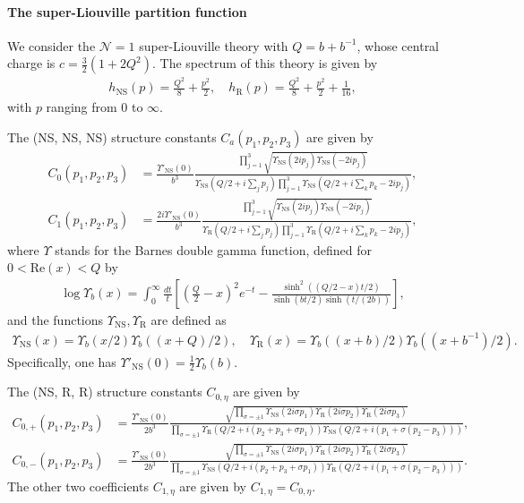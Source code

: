 \documentclass[12pt]{article}
\def\ie{\begin{equation}\begin{aligned}}
\def\fe{\end{aligned}\end{equation}}
\def\NS{\mathrm{NS}}
\def\R{\mathrm{R}}
\begin{document}
\begin{appendix}
\paragraph{The super-Liouville partition function} We consider the $\mathcal{N}=1$ super-Liouville theory with $Q=b+b^{-1}$, whose central charge is $c=\frac{3}{2}(1+2Q^2)$. The spectrum of this theory is given by
\ie
h_\NS(p) = \frac{Q^2}{8}+\frac{p^2}{2},\quad h_{\R}(p)= \frac{Q^2}{8}+\frac{p^2}{2} + \frac{1}{16},
\fe
with $p$ ranging from $0$ to $\infty$. 

The (NS, NS, NS) structure constants $C_a(p_1, p_2, p_3)$ are given by
\ie
C_0(p_1,p_2,p_3)&=\frac{\Upsilon'_{\NS}(0)}{b^3}
 \frac{\prod_{j=1}^3
       \sqrt{\Upsilon_{\NS}(2ip_j)\Upsilon_{\NS}(-2ip_j)}}
 {\Upsilon_{\NS}(Q/2+i\sum_jp_j)
       \prod_{j=1}^3\Upsilon_{\NS}(Q/2+i\sum_kp_k-2ip_j)},\\
C_1(p_1,p_2,p_3)&=\frac{2i\Upsilon'_{\NS}(0)}{b^3}
 \frac{\prod_{j=1}^3
       \sqrt{\Upsilon_{\NS}(2ip_j)\Upsilon_{\NS}(-2ip_j)}}
 {\Upsilon_{\R}(Q/2+i\sum_jp_j)
       \prod_{j=1}^3\Upsilon_{\R}(Q/2+i\sum_kp_k-2ip_j)},
\fe
where $\Upsilon$ stands for the Barnes double gamma function, defined for $0<\mathrm{Re}(x)<Q$ by
\ie
\log\Upsilon_b(x)=\int_0^\infty\frac{dt}{t}
 \left[\left(\frac Q2-x\right)^2e^{-t}
 -\frac{\sinh^2((Q/2-x)t/2)}
 {\sinh(bt/2)\sinh(t/(2b))}\right],
\fe
and the functions $\Upsilon_\NS, \Upsilon_\R$ are defined as
\ie
\Upsilon_{\NS}(x)=\Upsilon_b(x/2)\Upsilon_b((x+Q)/2),\quad
 \Upsilon_{\R}(x)=\Upsilon_b((x+b)/2)\Upsilon_b((x+b^{-1})/2).
\fe
Specifically, one has $\Upsilon'_{\NS}(0)=\frac12 \Upsilon_b(b)$.


The (NS, R, R) structure constants $C_{0,\eta}$ are given by
\ie
C_{0,+}(p_1,p_2,p_3)
 &=\frac{\Upsilon'_{\NS}(0)}{2b^3}
 \frac{\sqrt{\prod_{\sigma=\pm1}
     \Upsilon_{\NS}(2i\sigma p_1)
     \Upsilon_{\R}(2i\sigma p_2)\Upsilon_{\R}(2i\sigma p_3)}}
 {\prod_{\sigma=\pm1}
     \Upsilon_{\R}(Q/2+i(p_2+p_3+\sigma p_1))
     \Upsilon_{\NS}(Q/2+i(p_1+\sigma(p_2-p_3)))},\\
 C_{0,-}(p_1,p_2,p_3)
&=\frac{\Upsilon'_{\NS}(0)}{2b^3}
 \frac{\sqrt{\prod_{\sigma=\pm1}
     \Upsilon_{\NS}(2i\sigma p_1)
     \Upsilon_{\R}(2i\sigma p_2)\Upsilon_{\R}(2i\sigma p_3)}}
 {\prod_{\sigma=\pm1}
     \Upsilon_{\NS}(Q/2+i(p_2+p_3+\sigma p_1))
     \Upsilon_{\R}(Q/2+i(p_1+\sigma(p_2-p_3)))}.
\fe
The other two coefficients $C_{1,\eta}$ are given by $C_{1,\eta}=C_{0,\eta}$.


\end{appendix}
\end{document}
